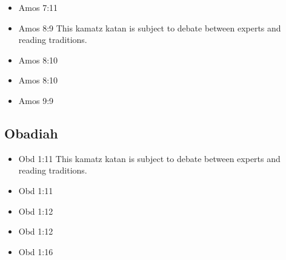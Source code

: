 \documentclass[14pt]{book}
\begin{document}
\begin{multicols}{2}
\begin{itemize}
																\item Amos 7:11
																
																\item Amos 8:9 This kamatz katan is subject to debate between experts and reading traditions.
																
																\item Amos 8:10
																
																\item Amos 8:10
																
																\item Amos 9:9
																
																								\end{itemize}\end{multicols}
															\subsection{Obadiah}
														\begin{multicols}{2}\begin{itemize}
																
																\item Obd 1:11 This kamatz katan is subject to debate between experts and reading traditions.
																
																\item Obd 1:11
																
																\item Obd 1:12
																
																\item Obd 1:12
																
																\item Obd 1:16
																
																								\end{itemize}\end{multicols}
\end{document}
